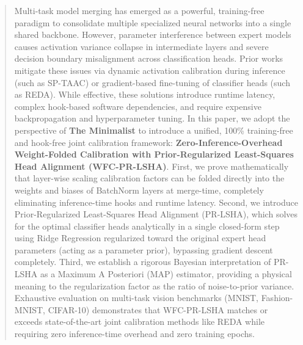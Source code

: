 \documentclass{article}
\theoremstyle{plain}
\theoremstyle{definition}
\theoremstyle{remark}
\begin{document}

\printAffiliationsAndNotice{}

\begin{abstract}
Multi-task model merging has emerged as a powerful, training-free paradigm to consolidate multiple specialized neural networks into a single shared backbone. However, parameter interference between expert models causes activation variance collapse in intermediate layers and severe decision boundary misalignment across classification heads. Prior works mitigate these issues via dynamic activation calibration during inference (such as SP-TAAC) or gradient-based fine-tuning of classifier heads (such as REDA). While effective, these solutions introduce runtime latency, complex hook-based software dependencies, and require expensive backpropagation and hyperparameter tuning. In this paper, we adopt the perspective of \textbf{The Minimalist} to introduce a unified, 100\% training-free and hook-free joint calibration framework: \textbf{Zero-Inference-Overhead Weight-Folded Calibration with Prior-Regularized Least-Squares Head Alignment (WFC-PR-LSHA)}. First, we prove mathematically that layer-wise scaling calibration factors can be folded directly into the weights and biases of BatchNorm layers at merge-time, completely eliminating inference-time hooks and runtime latency. Second, we introduce Prior-Regularized Least-Squares Head Alignment (PR-LSHA), which solves for the optimal classifier heads analytically in a single closed-form step using Ridge Regression regularized toward the original expert head parameters (acting as a parameter prior), bypassing gradient descent completely. Third, we establish a rigorous Bayesian interpretation of PR-LSHA as a Maximum A Posteriori (MAP) estimator, providing a physical meaning to the regularization factor as the ratio of noise-to-prior variance. Exhaustive evaluation on multi-task vision benchmarks (MNIST, Fashion-MNIST, CIFAR-10) demonstrates that WFC-PR-LSHA matches or exceeds state-of-the-art joint calibration methods like REDA while requiring zero inference-time overhead and zero training epochs.
\end{abstract}
\end{document}
